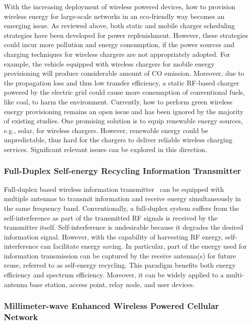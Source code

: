 \documentclass[twocolumn,10pt]{IEEEtran}
\begin{document}
With the increasing deployment of wireless powered devices, how to provision wireless energy for large-scale networks in an eco-friendly way becomes an emerging issue. As reviewed above, both static and mobile charger scheduling strategies have been developed for power replenishment. However, these strategies could incur more pollution and energy consumption, if the power sources and charging techniques for wireless chargers are not appropriately adopted. For example, the vehicle equipped with wireless chargers for mobile energy provisioning will produce considerable amount of CO emission. Moreover, due to the propagation loss and thus low transfer efficiency, a static RF-based charger powered by the electric grid could cause more consumption of conventional fuels, like coal, to harm the environment.  
Currently, how to perform green wireless energy provisioning remains an open issue and has been ignored by the majority of existing studies.
One promising solution is to equip renewable energy sources, e.g., solar, for wireless chargers. However, renewable energy could be unpredictable, thus hard for the chargers to deliver reliable wireless charging services. Significant relevant issues can be explored in this direction.



\subsubsection{Full-Duplex Self-energy Recycling Information Transmitter}

Full-duplex based wireless information transmitter~\cite{Y.2015Zeng} can be equipped with multiple antennas to transmit information and receive energy simultaneously in the same frequency band. Conventionally, a full-duplex system suffers from the self-interference as part of the transmitted RF signals is received by the transmitter itself. Self-interference is undesirable because it degrades the desired information signal. However, with the capability of harvesting RF energy, self-interference can facilitate energy saving. In particular, part of the energy used for information transmission can be captured by the receive antenna(s) for future reuse, referred to as self-energy recycling. This paradigm benefits both energy efficiency and spectrum efficiency. Moreover, it can be widely applied to a multi-antenna base station, access point, relay node, and user devices.   

\subsubsection{Millimeter-wave Enhanced Wireless Powered Cellular Network}
\end{document}
